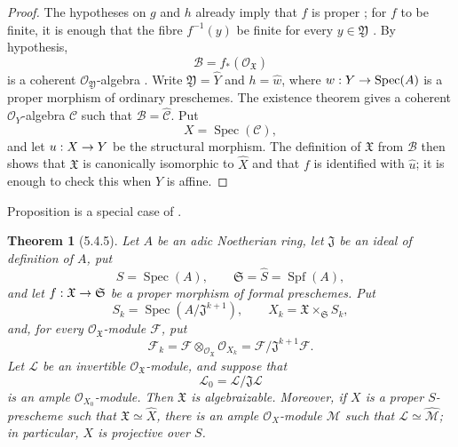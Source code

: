 \documentclass[oneside]{amsart}
\theoremstyle{ega-env-style}
\theoremstyle{ega-thm-env-style}
\newtheorem*{theorem}{Theorem}
\theoremstyle{ega-defn-env-style}
\def\mathcal{\mathscr}
\def\sh{\mathcal}                   %
\def\Spec{\operatorname{Spec}}
\def\Spf{\operatorname{Spf}}
\renewcommand{\to}{\mathchoice{\longrightarrow}{\rightarrow}{\rightarrow}{\rightarrow}}
\newcommand{\oldpage}[2][]{{\marginnote{\normalfont{\textbf{#1}~|~#2}}}\ignorespaces}
\let\EGAOriginalLabel\label
\renewcommand{\label}[1]{\phantomsection\EGAOriginalLabel{#1}}
\begin{document}
\begin{proof}
The hypotheses on $g$ and $h$ already imply that $f$ is proper
; for $f$ to be finite, it is enough that the fibre
$f^{-1}(y)$ be finite for every $y\in\mathfrak{Y}$
.  By hypothesis,
\[
  \sh{B}=f_*(\sh{O}_{\mathfrak{X}})
\]
is a coherent $\sh{O}_{\mathfrak{Y}}$-algebra
.  Write
$\mathfrak{Y}=\widehat{Y}$ and $h=\widehat{w}$, where
$w:Y\to\Spec(A)$ is a proper morphism of ordinary preschemes.  The
existence theorem gives a coherent $\sh{O}_Y$-algebra $\sh{C}$
such that $\sh{B}=\widehat{\sh{C}}$.  Put
\[
  X=\Spec(\sh{C}),
\]
and let $u:X\to Y$ be the structural morphism.  The definition of
$\mathfrak{X}$ from $\sh{B}$  then shows that
$\mathfrak{X}$ is canonically isomorphic to $\widehat{X}$ and
that $f$ is identified with $\widehat{u}$; it is enough to check
this when $Y$ is affine.
\end{proof}

Proposition  is a special case of
.

\begin{theorem}[5.4.5]
\label{III.5.4.5}
Let $A$ be an adic Noetherian ring, let $\mathfrak{J}$ be an ideal
of definition of $A$, put
\[
  S=\Spec(A),\qquad
  \mathfrak{S}=\widehat{S}=\Spf(A),
\]
and let $f:\mathfrak{X}\to\mathfrak{S}$ be a proper morphism of
formal preschemes.  Put
\[
  S_k=\Spec(A/\mathfrak{J}^{k+1}),\qquad
  X_k=\mathfrak{X}\times_{\mathfrak{S}}S_k,
\]
and, for every $\sh{O}_{\mathfrak{X}}$-module $\sh{F}$, put
\[
  \sh{F}_k
  =\sh{F}\otimes_{\sh{O}_{\mathfrak{X}}}\sh{O}_{X_k}
  =\sh{F}/\mathfrak{J}^{k+1}\sh{F}.
\]
\oldpage[III]{158}
Let $\sh{L}$ be an invertible
$\sh{O}_{\mathfrak{X}}$-module, and suppose that
\[
  \sh{L}_0=\sh{L}/\mathfrak{J}\sh{L}
\]
is an ample $\sh{O}_{X_0}$-module.  Then $\mathfrak{X}$ is
algebraizable.  Moreover, if $X$ is a proper $S$-prescheme such
that $\mathfrak{X}\simeq\widehat{X}$, there is an ample
$\sh{O}_X$-module $\sh{M}$ such that
$\sh{L}\simeq\widehat{\sh{M}}$; in particular, $X$ is projective
over $S$.
\end{theorem}
\end{document}
